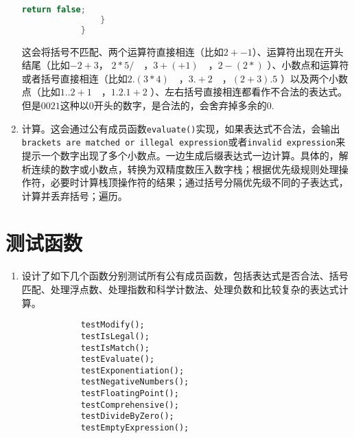 \documentclass[UTF8]{ctexart}
\begin{document}
\begin{enumerate}
\begin{lstlisting}[language=C++, caption={运算符实现}, label={lst:operators}]
					return false;
				}
			}
		\end{lstlisting}
		这会将括号不匹配、两个运算符直接相连（比如$2+-1$）、运算符出现在开头结尾（比如$-2+3$， $2*5/ \quad$，$3+(+1)\quad$，$2-(2*)$ ）、小数点和运算符或者括号直接相连（比如$2.(3*4)\quad$，$3.+2\quad$，$(2+3).5$ ）以及两个小数点（比如$1..2+1 \quad$，$1.2.1+2$ ）、左右括号直接相连都看作不合法的表达式。但是$0021$这种以$0$开头的数字，是合法的，会舍弃掉多余的0.
		\item 计算。这会通过公有成员函数\texttt{evaluate()}实现，如果表达式不合法，会输出\texttt{brackets are matched or illegal expression}或者\texttt{invalid expression}来提示一个数字出现了多个小数点。一边生成后缀表达式一边计算。具体的，解析连续的数字或小数点，转换为双精度数压入数字栈；根据优先级规则处理操作符，必要时计算栈顶操作符的结果；通过括号分隔优先级不同的子表达式，计算并丢弃括号；遍历。
	\end{enumerate}
	\section{测试函数}
	\begin{enumerate}
		\item 设计了如下几个函数分别测试所有公有成员函数，包括表达式是否合法、括号匹配、处理浮点数、处理指数和科学计数法、处理负数和比较复杂的表达式计算。
		\begin{lstlisting}
			testModify();
			testIsLegal();
			testIsMatch();
			testEvaluate();
			testExponentiation();
			testNegativeNumbers();
			testFloatingPoint(); 
			testComprehensive(); 
			testDivideByZero();  
			testEmptyExpression();
		\end{lstlisting}
	\end{enumerate}
\end{document}
